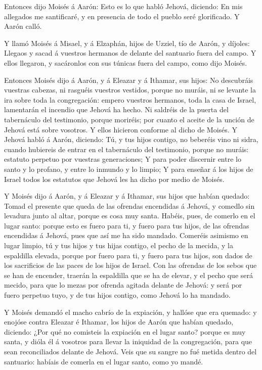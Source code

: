  Entonces dijo Moisés á Aarón: Esto es lo que habló Jehová,
diciendo: En mis allegados me santificaré, y en presencia de todo el
pueblo seré glorificado. Y Aarón calló.

 Y llamó Moisés á Misael, y á Elzaphán, hijos de Uzziel, tío
de Aarón, y díjoles: Llegaos y sacad á vuestros hermanos de delante del
santuario fuera del campo.  Y ellos llegaron, y sacáronlos
con sus túnicas fuera del campo, como dijo Moisés.

 Entonces Moisés dijo á Aarón, y á Eleazar y á Ithamar, sus
hijos: No descubráis vuestras cabezas, ni rasguéis vuestros vestidos,
porque no muráis, ni se levante la ira sobre toda la congregación:
empero vuestros hermanos, toda la casa de Israel, lamentarán el incendio
que Jehová ha hecho.  Ni saldréis de la puerta del
tabernáculo del testimonio, porque moriréis; por cuanto el aceite de la
unción de Jehová está sobre vosotros. Y ellos hicieron conforme al dicho
de Moisés.  Y Jehová habló á Aarón, diciendo: 
Tú, y tus hijos contigo, no beberéis vino ni sidra, cuando hubiereis de
entrar en el tabernáculo del testimonio, porque no muráis: estatuto
perpetuo por vuestras generaciones;  Y para poder discernir
entre lo santo y lo profano, y entre lo inmundo y lo limpio;
 Y para enseñar á los hijos de Israel todos los estatutos
que Jehová les ha dicho por medio de Moisés.

 Y Moisés dijo á Aarón, y á Eleazar y á Ithamar, sus hijos
que habían quedado: Tomad el presente que queda de las ofrendas
encendidas á Jehová, y comedlo sin levadura junto al altar, porque es
cosa muy santa.  Habéis, pues, de comerlo en el lugar
santo: porque esto es fuero para ti, y fuero para tus hijos, de las
ofrendas encendidas á Jehová, pues que así me ha sido mandado.
 Comeréis asimismo en lugar limpio, tú y tus hijos y tus
hijas contigo, el pecho de la mecida, y la espaldilla elevada, porque
por fuero para ti, y fuero para tus hijos, son dados de los sacrificios
de las paces de los hijos de Israel.  Con las ofrendas de
los sebos que se han de encender, traerán la espaldilla que se ha de
elevar, y el pecho que será mecido, para que lo mezas por ofrenda
agitada delante de Jehová: y será por fuero perpetuo tuyo, y de tus
hijos contigo, como Jehová lo ha mandado.

 Y Moisés demandó el macho cabrío de la expiación, y
hallóse que era quemado: y enojóse contra Eleazar é Ithamar, los hijos
de Aarón que habían quedado, diciendo:  ¿Por qué no
comisteis la expiación en el lugar santo? porque es muy santa, y dióla
él á vosotros para llevar la iniquidad de la congregación, para que sean
reconciliados delante de Jehová.  Veis que su sangre no fué
metida dentro del santuario: habíais de comerla en el lugar santo, como
yo mandé.

